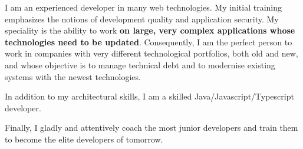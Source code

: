 


\begin{cvparagraph}
\begin{changemargin}{0cm}{5cm}
I am an experienced developer in many web technologies. My initial training emphasizes the notions of development quality and application security. My speciality is the ability to work \textbf{on large, very complex applications whose technologies need to be updated}.
Consequently, I am the perfect person to work in companies with very different technological portfolios, both old and new, and whose objective is to manage technical debt and to modernise existing systems with the newest technologies.

In addition to my architectural skills, I am a skilled Java/Javascript/Typescript developer.

Finally, I gladly and attentively coach the most junior developers and train them to become the elite developers of tomorrow.
\end{changemargin}
\end{cvparagraph}